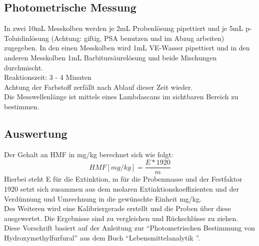 \subsection{Photometrische Messung}
In zwei 10mL Messkolben werden je 2mL Probenlösung pipettiert und je 5mL p-Toluidinlösung (Achtung: giftig, PSA benutzen und im Abzug arbeiten) zugegeben. In den einen Messkolben wird 1mL VE-Wasser pipettiert und in den anderen Messkolben 1mL Barbitursäurelösung und beide Mischungen durchmischt.\\ 
Reaktionszeit: 3 - 4 Minuten\\
Achtung der Farbstoff zerfällt nach Ablauf dieser Zeit wieder.\\
Die Messwellenlänge ist mittels eines Lambdascans im sichtbaren Bereich zu bestimmen.
\subsection{Auswertung}
Der Gehalt an HMF in mg/kg berechnet sich wie folgt:\\
\[HMF[mg/kg]=\frac{ E * 1920 }{ m }\]
Hierbei steht E für die Extinktion, m für die Probenmasse und der Festfaktor 1920 setzt sich zusammen aus dem molaren Extinktionskoeffizienten und der Verdünnung und Umrechnung in die gewünschte Einheit mg/kg.\\
Des Weiteren wird eine Kalibriergerade erstellt und die Proben über diese ausgewertet.
Die Ergebnisse sind zu vergleichen und Rückschlüsse zu ziehen.\\
Diese Vorschrift basiert auf der Anleitung zur ``Photometrischen Bestimmung von Hydroxymethylfurfural'' aus dem Buch ``Lebensmittelanalytik \cite{Lebensmittelanalytik}''.